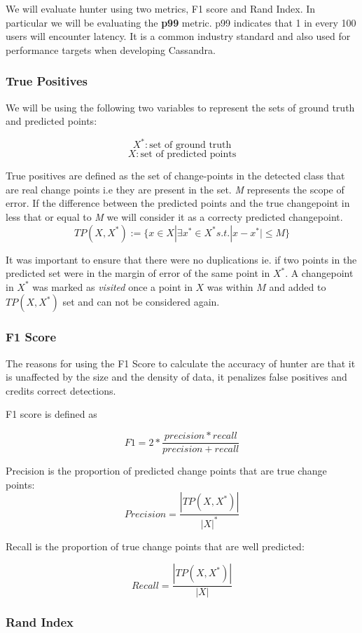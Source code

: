 \documentclass[sigconf]{acmart}
\begin{document}
We will evaluate hunter using two metrics, F1 score and Rand Index. In particular we will be
evaluating the \textbf{p99} metric. p99 indicates that 1 in every 100 users will encounter latency.
It is a common industry standard and also used for performance targets when developing Cassandra.

\subsubsection{True Positives}
We will be using the following two variables to represent the sets of ground truth and predicted points:

$$X^{*}: \text{set of ground truth}$$
$$X : \text{set of predicted points}$$

True positives are defined as the set of change-points in the detected class that are real change points i.e they are present in the set.
\textit{M} represents the scope of error. If the difference between the predicted points and the true changepoint in less that or equal to \textit{M} we will consider it as a correcty predicted changepoint.
$$TP(X , X^*) := \{x \in X | \exists  x^* \in X^*  s.t. |x- x^* | \leq M\}$$

It was important to ensure that there were no duplications ie. if two points in the predicted set were in the margin of error of the same point in $X^{*}$. A  changepoint in $X^{*}$ was marked as \textit{visited} once a point in $X$ was within $M$ and added to $TP(X,X^{*})$ set and can not be considered again. 

\subsubsection{F1 Score}
The reasons for using the F1 Score to calculate the accuracy of hunter are that it is unaffected by the size and the density of data, it penalizes false positives and credits correct detections.

F1 score is defined as

$$F1 =2* \frac{precision * recall}{precision + recall}$$

Precision is the proportion of predicted change points that are true change points:\cite{SELECTREVIEW}
$$Precision  = \frac{|TP(X,X^*)|}{|X|^*}$$ 

Recall is the proportion of true change points that are well predicted:\cite{SELECTREVIEW}

$$Recall = \frac{|TP(X,X^*)|}{|X|}$$

\subsubsection{Rand Index}
\end{document}
